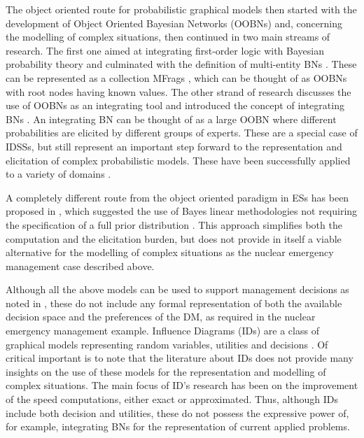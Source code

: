 The object oriented route for probabilistic graphical models then started with the development of Object Oriented Bayesian Networks (OOBNs) \citep{Koller97} and, concerning the modelling of complex situations, then continued in two main streams of research. The first one aimed at integrating first-order logic with Bayesian probability theory and culminated with the definition of multi-entity BNs \citep{Laskey2008, Laskey2009}. These can be represented as a collection MFrags \citep{Laskey1997}, which can be thought of as OOBNs with root nodes having known values. The other strand of research discusses the use of OOBNs as an integrating tool and introduced the concept of integrating BNs \citep{Johnson2012a}. An integrating BN can be thought of as a large OOBN where different probabilities are elicited by different groups of experts. These are a special case of IDSSs, but still represent an important step forward to the representation and elicitation of complex probabilistic models. These have been successfully applied to a variety of domains \citep{Johnson2013, Johnson2014,Mortera2013}.   

A completely different route from the object oriented paradigm in ESs has been proposed in \citet{Goldstein96}, which suggested the use of Bayes linear methodologies not requiring the specification of a full prior distribution \citep[see e.g.][]{Goldstein2007}. This approach simplifies both the computation and the elicitation burden, but does not provide in itself a viable alternative for the modelling of complex situations as the nuclear emergency management case described above.

Although all the above models can be used to support management decisions as noted in \citet{Johnson2014}, these do not include any formal representation of both the available decision space and the preferences of the DM, as required in the nuclear emergency management example. Influence Diagrams (IDs) are a class of graphical models  representing random variables, utilities and decisions \citep[see e.g.][and Section \ref{sec:id}]{Bielza2011,Howard2005,Jensen2013}. Of critical important is to  note that the literature about IDs does not provide many insights on the use of these models for the representation and modelling of complex situations. The main focus of ID's research has been on the improvement of the speed computations, either exact or approximated. Thus, although IDs include both decision and utilities, these  do not possess the expressive power of, for example, integrating BNs for the representation of current applied problems.

